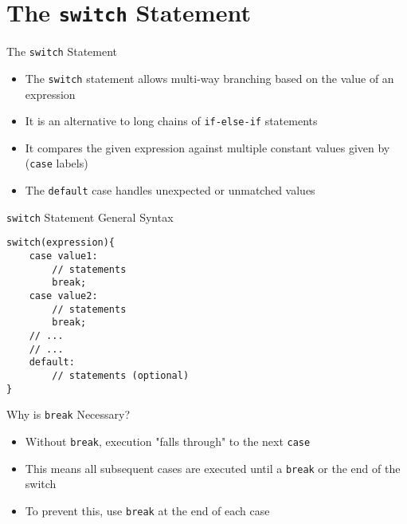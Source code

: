 \documentclass[12pt, aspectratio=169]{beamer}
\begin{document}






    \section{The \texttt{switch} Statement}

    \begin{frame}{The \texttt{switch} Statement}
        \begin{itemize}
            \item The \texttt{switch} statement allows multi-way branching based on the value of an expression
            \item It is an alternative to long chains of \texttt{if-else-if} statements
            \item It compares the given expression against multiple constant values given by (\texttt{case} labels)
            \item The \texttt{default} case handles unexpected or unmatched values
        \end{itemize}
    \end{frame}


    \begin{frame}[fragile]{\texttt{switch} Statement General Syntax}
        \begin{verbatim}
switch(expression){
    case value1:
        // statements
        break;
    case value2:
        // statements
        break;
    // ...
    // ...
    default:
        // statements (optional)
}
        \end{verbatim}
    \end{frame}


    \begin{frame}{Why is \texttt{break} Necessary?}
        \begin{itemize}
            \item Without \texttt{break}, execution "falls through" to the next \texttt{case}
            \item This means all subsequent cases are executed until a \texttt{break} or the end of the switch
            \item To prevent this, use \texttt{break} at the end of each case
        \end{itemize}
    \end{frame}
\end{document}
